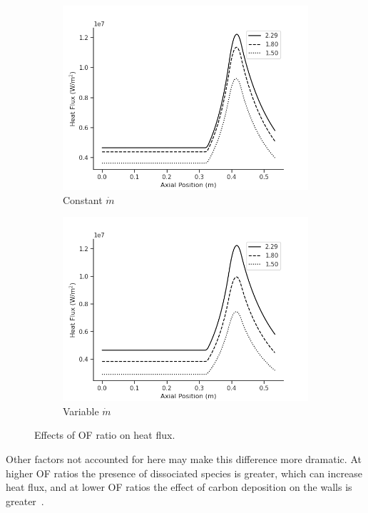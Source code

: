 \documentclass[11pt]{article}
\begin{document}
\begin{figure}[H]
  \centering
  \begin{subfigure}{.5\textwidth}
    \centering
    \includegraphics[width=\linewidth]{OF_Constant.png}
    \caption{Constant $\dot{m}$}
  \end{subfigure}%
  \begin{subfigure}{.5\textwidth}
    \centering
    \includegraphics[width=\linewidth]{OF_Variable.png}
    \caption{Variable $\dot{m}$}
  \end{subfigure}
  \caption{Effects of OF ratio on heat flux.}
  \label{fig:of_ratio}
\end{figure}

Other factors not accounted for here may make this difference more dramatic. At higher OF ratios the presence of dissociated species is greater, which can increase heat flux, and at lower OF ratios the effect of carbon deposition on the walls is greater~\cite{cook_advanced_1980}.
\end{document}
